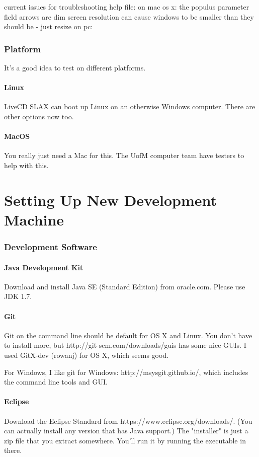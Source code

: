 \documentclass[12pt]{article}
\begin{document}
current issues for troubleshooting help file:
on mac os x:
the populus parameter field arrows are dim
screen resolution can cause windows to be smaller than they should be - just resize
on pc:

\section{Platform}
It's a good idea to test on different platforms.
\subsection{Linux}
LiveCD SLAX can boot up Linux on an otherwise Windows computer.  There are other options now too.
\subsection{MacOS}
You really just need a Mac for this.  The UofM computer team have testers to help with this.

\part{Setting Up New Development Machine}
\section{Development Software}
\subsection{Java Development Kit}
Download and install Java SE (Standard Edition) from oracle.com.  Please use JDK 1.7.

\subsection{Git}
Git on the command line should be default for OS X and Linux.  You don't have to install more, but http://git-scm.com/downloads/guis has some nice GUIs.  I used GitX-dev (rowanj) for OS X, which seems good.

For Windows, I like git for Windows:  http://msysgit.github.io/, which includes the command line tools and GUI.

\subsection{Eclipse}
Download the Eclipse Standard from https://www.eclipse.org/downloads/.  (You can actually install any version that has Java support.)  The "installer" is just a zip file that you extract somewhere.  You'll run it by running the executable in there.
\end{document}
